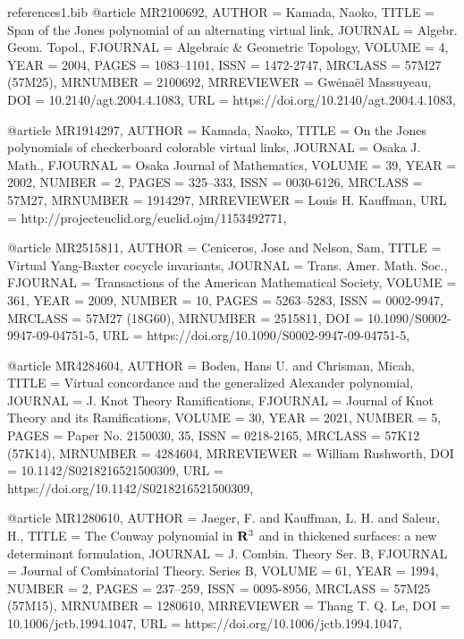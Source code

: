 \documentclass[11pt, reqno]{amsart}
\theoremstyle{definition}
\begin{document}
\begin{filecontents*}[overwrite]{references1.bib}
@article {MR2100692,
    AUTHOR = {Kamada, Naoko},
     TITLE = {Span of the {J}ones polynomial of an alternating virtual link},
   JOURNAL = {Algebr. Geom. Topol.},
  FJOURNAL = {Algebraic \& Geometric Topology},
    VOLUME = {4},
      YEAR = {2004},
     PAGES = {1083--1101},
      ISSN = {1472-2747},
   MRCLASS = {57M27 (57M25)},
  MRNUMBER = {2100692},
MRREVIEWER = {Gw\'{e}na\"{e}l Massuyeau},
       DOI = {10.2140/agt.2004.4.1083},
       URL = {https://doi.org/10.2140/agt.2004.4.1083},
}

@article {MR1914297,
    AUTHOR = {Kamada, Naoko},
     TITLE = {On the {J}ones polynomials of checkerboard colorable virtual
              links},
   JOURNAL = {Osaka J. Math.},
  FJOURNAL = {Osaka Journal of Mathematics},
    VOLUME = {39},
      YEAR = {2002},
    NUMBER = {2},
     PAGES = {325--333},
      ISSN = {0030-6126},
   MRCLASS = {57M27},
  MRNUMBER = {1914297},
MRREVIEWER = {Louis H. Kauffman},
       URL = {http://projecteuclid.org/euclid.ojm/1153492771},
}
	
@article {MR2515811,
    AUTHOR = {Ceniceros, Jose and Nelson, Sam},
     TITLE = {Virtual {Y}ang-{B}axter cocycle invariants},
   JOURNAL = {Trans. Amer. Math. Soc.},
  FJOURNAL = {Transactions of the American Mathematical Society},
    VOLUME = {361},
      YEAR = {2009},
    NUMBER = {10},
     PAGES = {5263--5283},
      ISSN = {0002-9947},
   MRCLASS = {57M27 (18G60)},
  MRNUMBER = {2515811},
       DOI = {10.1090/S0002-9947-09-04751-5},
       URL = {https://doi.org/10.1090/S0002-9947-09-04751-5},
}

@article {MR4284604,
    AUTHOR = {Boden, Hans U. and Chrisman, Micah},
     TITLE = {Virtual concordance and the generalized {A}lexander
              polynomial},
   JOURNAL = {J. Knot Theory Ramifications},
  FJOURNAL = {Journal of Knot Theory and its Ramifications},
    VOLUME = {30},
      YEAR = {2021},
    NUMBER = {5},
     PAGES = {Paper No. 2150030, 35},
      ISSN = {0218-2165},
   MRCLASS = {57K12 (57K14)},
  MRNUMBER = {4284604},
MRREVIEWER = {William Rushworth},
       DOI = {10.1142/S0218216521500309},
       URL = {https://doi.org/10.1142/S0218216521500309},
}

@article {MR1280610,
    AUTHOR = {Jaeger, F. and Kauffman, L. H. and Saleur, H.},
     TITLE = {The {C}onway polynomial in {${\bf R}^3$} and in thickened
              surfaces: a new determinant formulation},
   JOURNAL = {J. Combin. Theory Ser. B},
  FJOURNAL = {Journal of Combinatorial Theory. Series B},
    VOLUME = {61},
      YEAR = {1994},
    NUMBER = {2},
     PAGES = {237--259},
      ISSN = {0095-8956},
   MRCLASS = {57M25 (57M15)},
  MRNUMBER = {1280610},
MRREVIEWER = {Thang T. Q. Le},
       DOI = {10.1006/jctb.1994.1047},
       URL = {https://doi.org/10.1006/jctb.1994.1047},
}


\end{filecontents*}
\end{document}
